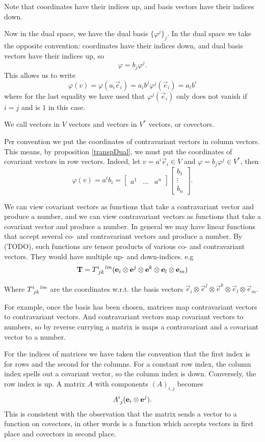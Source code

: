 Note that coordinates have their indices up, and basis vectors have their indices down.

Now in the dual space, we have the dual basis $\{\varphi^j\}_j$. In the dual space we take the opposite convention: coordinates have their indices down, and dual basis vectors have their indices up, so
\[ \varphi = b_j \varphi^j. \]
This allows us to write
\[ \varphi(v) = \varphi(a_i \vec{e}_i) = a_i b^j \varphi^j(\vec{e}_i) = a_i b^i \]
where for the last equality we have used that $\varphi^j(\vec{e}_i)$ only does not vanish if $i=j$ and is $1$ in this case.

We call vectors in $V$  vectors and vectors in $V^*$  vectors, or covectors.

Per convention we put the coordinates of contravariant vectors in column vectors. This means, by proposition \ref{transpDual}, we must put the coordinates of covariant vectors in row vectors. Indeed, let $v=a^i \vec{e}_i\in V$ and $\varphi = b_j\varphi^j \in V^*$, then
\[ \varphi(v) = a^ib_i = \begin{bmatrix}
a^1 & \hdots & a^n
\end{bmatrix}\begin{bmatrix}
b_1 \\ \vdots  \\ b_n
\end{bmatrix}. \]

We can view covariant vectors as functions that take a contravariant vector and produce a number, and we can view contravariant vectors as functions that take a covariant vector and produce a number. In general we may have linear functions that accept several co- and contravariant vectors and produce a number. By (TODO), such functions are tensor products of various co- and contravariant vectors. They would have multiple up- and down-indices. e.g\
\[ \vec{T} = \tensor{T}{^i_j_k^l^m}(\vec{e}_i\otimes \vec{e}^j\otimes \vec{e}^k\otimes \vec{e}_l \otimes \vec{e}_m) \]

Where $\tensor{T}{^i_j_k^l^m}$ are the coordinates w.r.t. the basis vectors $\vec{e}_i\otimes \vec{e}^j\otimes \vec{e}^k \otimes\vec{e}_l \otimes \vec{e}_m$.

For example, once the basis has been chosen, matrices map contravariant vectors to contravariant vectors. And contravariant vectors map covariant vectors to numbers, so by reverse currying a matrix is maps a contravariant and a covariant vector to a number.

For the indices of matrices we have taken the convention that the first index is for rows and the second for the columns. For a constant row index, the column index spells out a covariant vector, so the column index is down. Conversely, the row index is up. A matrix $A$ with components $(A)_{i,j}$ becomes
\[ \tensor{A}{^i_j}(\vec{e}_i\otimes \vec{e}^j). \]
This is consistent with the observation that the matrix sends a vector to a function on covectors, in other words is a function which accepts vectors in first place and covectors in second place.

